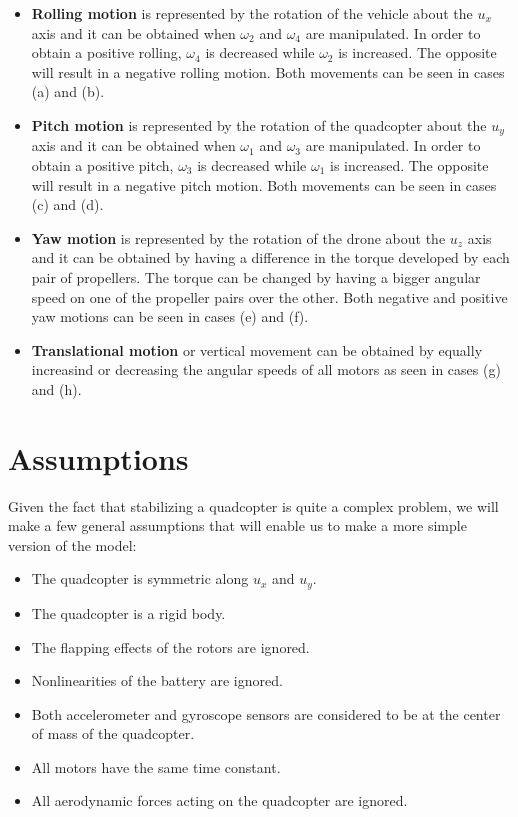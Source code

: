 \begin{itemize}
  \item \textbf{Rolling motion} is represented by the rotation of the vehicle about the $u_{x}$ axis and it can be obtained when $\omega_{2}$ and $\omega_{4}$ are manipulated. In order to obtain a positive rolling, $\omega_{4}$ is decreased while $\omega_{2}$ is increased. The opposite will result in a negative rolling motion. Both movements can be seen in cases (a) and (b).
  \item \textbf{Pitch motion} is represented by the rotation of the quadcopter about the $u_{y}$ axis and it can be obtained when $\omega_{1}$ and $\omega_{3}$ are manipulated. In order to obtain a positive pitch, $\omega_{3}$ is decreased while $\omega_{1}$ is increased. The opposite will result in a negative pitch motion. Both movements can be seen in cases (c) and (d).
  \item \textbf{Yaw motion} is represented by the rotation of the drone about the $u_{z}$ axis and it can be obtained by having a difference in the torque developed by each pair of propellers. The torque can be changed by having a bigger angular speed on one of the propeller pairs over the other. Both negative and positive yaw motions can be seen in cases (e) and (f).
  \item \textbf{Translational motion} or vertical movement can be obtained by equally increasind or decreasing the angular speeds of all motors as seen in cases (g) and (h)\cite{Report1}.
\end{itemize} 

\section{Assumptions}
Given the fact that stabilizing a quadcopter is quite a complex problem, we will make a few general assumptions that will enable us to make a more simple version of the model:
\begin{itemize}
  \item The quadcopter is symmetric along $u_{x}$ and $u_{y}$.
  \item The quadcopter is a rigid body.
  \item The flapping effects of the rotors are ignored.
  \item Nonlinearities of the battery are ignored.
  \item Both accelerometer and gyroscope sensors are considered to be at the center of mass of the quadcopter.
  \item All motors have the same time constant.
  \item All aerodynamic forces acting on the quadcopter are ignored.
\end{itemize} 